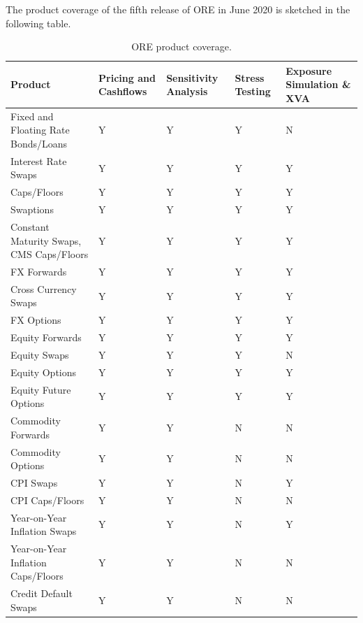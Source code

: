 \documentclass[12pt, a4paper]{article}
\begin{document}
\medskip 
The product coverage of the fifth release of ORE in June 2020 is sketched in the following table.
\begin{table}[hbt]
\scriptsize
\begin{center}
\begin{tabular}{|l|p{1.5cm}|p{1.5cm}|p{1.2cm}|p{1.5cm}|}
\hline
Product & Pricing and Cashflows & Sensitivity Analysis & Stress Testing & Exposure Simulation \& XVA\\
\hline
Fixed and Floating Rate Bonds/Loans & Y & Y & Y & N \\
\hline
Interest Rate Swaps & Y & Y & Y & Y\\
\hline
Caps/Floors & Y & Y & Y & Y\\
\hline
Swaptions & Y & Y & Y &Y \\
\hline
Constant Maturity Swaps, CMS Caps/Floors & Y & Y & Y & Y\\
\hline
FX Forwards & Y & Y & Y & Y \\
\hline
Cross Currency Swaps & Y & Y & Y & Y \\
\hline
FX Options & Y & Y & Y & Y\\
\hline
Equity Forwards & Y & Y & Y & Y\\
\hline
Equity Swaps & Y & Y & Y & N\\
\hline
Equity Options & Y & Y & Y & Y \\
\hline
Equity Future Options & Y & Y & Y & Y \\
\hline
Commodity Forwards & Y & Y & N & N\\
\hline
Commodity Options & Y & Y & N & N \\
\hline
CPI Swaps & Y & Y & N & Y \\
\hline
CPI Caps/Floors & Y & Y & N & N\\
\hline
Year-on-Year Inflation Swaps & Y & Y & N & Y \\
\hline
Year-on-Year Inflation Caps/Floors & Y & Y & N & N\\
\hline
Credit Default Swaps & Y & Y & N & N \\
\hline

\end{tabular}
\caption{ORE product coverage.}
\label{tab_coverage}
\end{center}
\end{table}
\end{document}

